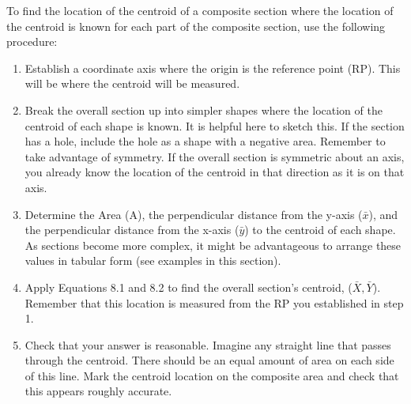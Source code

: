 \documentclass[
  letterpaper,
  DIV=11,
  numbers=noendperiod]{scrreprt}
\providecommand{\tightlist}{%
  \setlength{\itemsep}{0pt}\setlength{\parskip}{0pt}}\usepackage{longtable,booktabs,array}
\begin{document}
\begin{tcolorbox}[enhanced jigsaw, breakable, opacityback=0, toptitle=1mm, left=2mm, colback=white, opacitybacktitle=0.6, colframe=quarto-callout-warning-color-frame, titlerule=0mm, arc=.35mm, leftrule=.75mm, bottomtitle=1mm, colbacktitle=quarto-callout-warning-color!10!white, rightrule=.15mm, title=\textcolor{quarto-callout-warning-color}{\faExclamationTriangle}\hspace{0.5em}{Step-by-step: Finding the Centroid of Composite Sections}, bottomrule=.15mm, toprule=.15mm, coltitle=black]

To find the location of the centroid of a composite section where the
location of the centroid is known for each part of the composite
section, use the following procedure:

\begin{enumerate}
\def\labelenumi{\arabic{enumi}.}
\tightlist
\item
  Establish a coordinate axis where the origin is the reference point
  (RP). This will be where the centroid will be measured.
\item
  Break the overall section up into simpler shapes where the location of
  the centroid of each shape is known. It is helpful here to sketch
  this. If the section has a hole, include the hole as a shape with a
  negative area. Remember to take advantage of symmetry. If the overall
  section is symmetric about an axis, you already know the location of
  the centroid in that direction as it is on that axis.
\item
  Determine the Area (A), the perpendicular distance from the y-axis
  (\(\bar{x}\)), and the perpendicular distance from the x-axis
  (\(\bar{y}\)) to the centroid of each shape. As sections become more
  complex, it might be advantageous to arrange these values in tabular
  form (see examples in this section).
\item
  Apply Equations 8.1 and 8.2 to find the overall section's centroid,
  (\(\bar{X}, \bar{Y}\)). Remember that this location is measured from
  the RP you established in step 1.
\item
  Check that your answer is reasonable. Imagine any straight line that
  passes through the centroid. There should be an equal amount of area
  on each side of this line. Mark the centroid location on the composite
  area and check that this appears roughly accurate.
\end{enumerate}

\end{tcolorbox}
\end{document}
